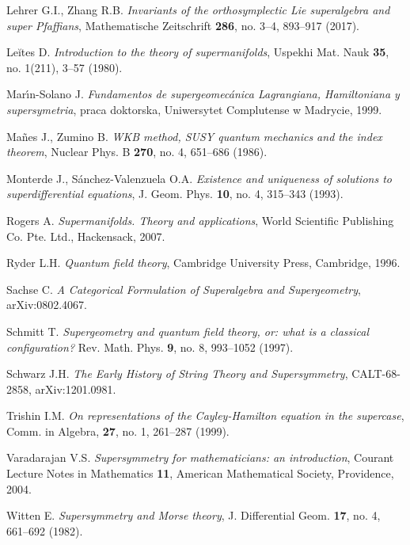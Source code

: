 \documentclass[11pt,a4paper]{report}
\theoremstyle{definition}
\begin{document}
\begin{thebibliography}{}
	Lehrer G.I., Zhang R.B.
	{\it Invariants of the orthosymplectic Lie superalgebra and super Pfaffians},
	Mathematische Zeitschrift {\bf 286}, no. 3--4, 893--917 (2017).
						      					
	Leĭtes D. \textit{Introduction to the theory of supermanifolds}, Uspekhi Mat. Nauk {\bf 35}, no. 1(211), 3--57 (1980).
						      					
	Mar\'{\i}n-Solano J. {\sl Fundamentos de supergeomec\'anica Lagrangiana, Hamiltoniana y supersymetria}, praca doktorska, Uniwersytet Complutense w Madrycie, 1999.
						      					
	Ma\~nes J., Zumino B. \textit{WKB method, SUSY quantum mechanics and the index theorem}, Nuclear Phys. B {\bf 270}, no. 4, 651--686 (1986).
						      					
	Monterde J., S\'anchez-Valenzuela O.A. \textit{Existence and uniqueness of solutions to superdifferential equations}, J. Geom. Phys. {\bf 10}, no. 4, 315--343 (1993).
						      					
	Rogers A. \textsl{Supermanifolds. Theory and applications}, World Scientific Publishing Co. Pte. Ltd., Hackensack, 2007.
						      					
	Ryder L.H. \textsl{Quantum field theory}, Cambridge University Press, Cambridge, 1996.
						      					
	Sachse C.
	{\it A Categorical Formulation of Superalgebra and Supergeometry}, arXiv:0802.4067.
						      					
	Schmitt T. \textit{Supergeometry and quantum field theory, or: what is a classical configuration?} Rev. Math. Phys. {\bf 9}, no. 8, 993--1052 (1997).
						      					
	Schwarz J.H.
	{\it The Early History of String Theory and Supersymmetry},
	CALT-68-2858, arXiv:1201.0981.
						      					
	Trishin I.M. 
	{\it On representations of the Cayley-Hamilton equation in
		the supercase}, Comm. in Algebra, {\bf 27}, no. 1, 261--287 (1999).
						      					
	Varadarajan V.S. \textsl{Supersymmetry for mathematicians: an introduction}, Courant Lecture Notes in Mathematics {\bf 11}, American Mathematical Society, Providence, 2004.
						      					
	Witten E. \textit{Supersymmetry and Morse theory}, J. Differential Geom. {\bf 17}, no. 4, 661--692 (1982).
						      					
\end{thebibliography}
\newpage
			      				
{}
\printindex
			      				
\end{document}
